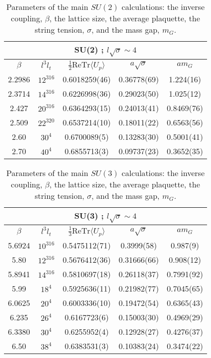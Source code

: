 \documentclass[12pt]{article}
\begin{document}
\begin{table}[htb]
\centering
\begin{tabular}{|cc|ccc|} \hline
\multicolumn{5}{|c|}{SU(2) ; $l\surd\sigma\sim 4$ } \\ \hline
$\beta$ & $l^3l_t$ & $\tfrac{1}{2}\text{ReTr}\langle U_p\rangle$ & 
$a\surd\sigma$ & $am_G$  \\ \hline
 2.2986 & $12^316$  & 0.6018259(46)  & 0.36778(69)  & 1.224(16)  \\
 2.3714 & $14^316$  & 0.6226998(36)  & 0.29023(50)  & 1.025(12)  \\
 2.427  & $20^316$  & 0.6364293(15)  & 0.24013(41)  & 0.8469(76)  \\
 2.509  & $22^320$  & 0.6537214(10)  & 0.18011(22)  & 0.6563(56)  \\
 2.60   & $30^4$    & 0.6700089(5)   & 0.13283(30)  & 0.5001(41)  \\
 2.70   & $40^4$    & 0.6855713(3)   & 0.09737(23)  & 0.3652(35)  \\ \hline
\end{tabular}
\caption{Parameters of the main $SU(2)$ calculations: the inverse coupling, $\beta$, the lattice size, the
  average plaquette, the string tension, $\sigma$, and the  mass gap, $m_G$.}
\label{table_param_SU2}
\end{table}

\begin{table}[htb]
\centering
\begin{tabular}{|cc|ccc|} \hline
\multicolumn{5}{|c|}{SU(3) ; $l\surd\sigma\sim 4$}  \\ \hline
$\beta$ & $l^3l_t$ & $\tfrac{1}{3}\text{ReTr}\langle U_p\rangle$ & 
$a\surd\sigma$ & $am_G$  \\ \hline
5.6924 & $10^316$ & 0.5475112(71) & 0.3999(58)  & 0.987(9)    \\
5.80   & $12^316$ & 0.5676412(36) & 0.31666(66) & 0.908(12)   \\
5.8941 & $14^316$ & 0.5810697(18) & 0.26118(37) & 0.7991(92) \\
5.99   & $18^4$ &  0.5925636(11)  & 0.21982(77) & 0.7045(65)  \\
6.0625 & $20^4$ &  0.6003336(10)  & 0.19472(54) & 0.6365(43)  \\
6.235  & $26^4$ &  0.6167723(6)   & 0.15003(30) & 0.4969(29)  \\
6.3380 & $30^4$ &  0.6255952(4)   & 0.12928(27) & 0.4276(37)  \\
6.50   & $38^4$ &  0.6383531(3)   & 0.10383(24) & 0.3474(22)  \\ \hline
\end{tabular}
\caption{Parameters of the main $SU(3)$ calculations: the inverse coupling, $\beta$, the lattice size, the
  average plaquette, the string tension, $\sigma$, and the  mass gap, $m_G$.}
\label{table_param_SU3}
\end{table}
\end{document}
